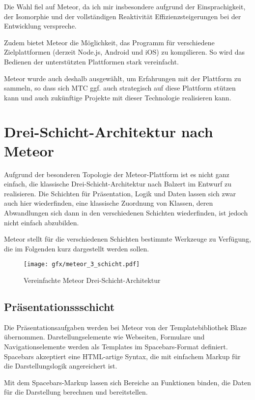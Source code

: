 Die Wahl fiel auf Meteor, da ich mir insbesondere aufgrund der Einsprachigkeit,
der Isomorphie und der vollständigen Reaktivität Effizienzsteigerungen bei der
Entwicklung verspreche.

Zudem bietet Meteor die Möglichkeit, das Programm für verschiedene
Zielplattformen (derzeit Node.js, Android und iOS) zu kompilieren. So wird das
Bedienen der unterstützten Plattformen stark vereinfacht.

Meteor wurde auch deshalb ausgewählt, um Erfahrungen mit der Plattform zu
sammeln, so dass sich MTC ggf. auch strategisch auf diese Plattform stützen kann
und auch zukünftige Projekte mit dieser Technologie realisieren kann.

\section{Drei-Schicht-Architektur nach Meteor}

Aufgrund der besonderen Topologie der Meteor-Plattform ist es nicht ganz
einfach, die klassische Drei-Schicht-Architektur nach Balzert \cite{balzert} im
Entwurf zu realisieren. Die Schichten für Präsentation, Logik und Daten lassen
sich zwar auch hier wiederfinden, eine klassische Zuordnung von Klassen, deren
Abwandlungen sich dann in den verschiedenen Schichten wiederfinden, ist jedoch
nicht einfach abzubilden.

Meteor stellt für die verschiedenen Schichten bestimmte Werkzeuge zu Verfügung,
die im Folgenden kurz dargestellt werden sollen.

\begin{figure}[h]
  \texttt{[image: gfx/meteor\_3\_schicht.pdf]}
  \caption{Vereinfachte Meteor Drei-Schicht-Architektur}
  \label{fig:MeteorDreiSchichtArchitektur}
\end{figure}

\subsection{Präsentationssschicht}

Die Präsentationsaufgaben werden bei Meteor von der Templatebibliothek Blaze
\cite{blaze} übernommen. Darstellungselemente wie Webseiten, Formulare und
Navigationselemente werden als Templates im Spacebars-Format definiert.
Spacebars \cite{spacebars} akzeptiert eine HTML-artige Syntax, die mit einfachem
Markup für die Darstellungslogik angereichert ist.

Mit dem Spacebars-Markup lassen sich Bereiche an Funktionen binden, die
Daten für die Darstellung berechnen und bereitstellen.

